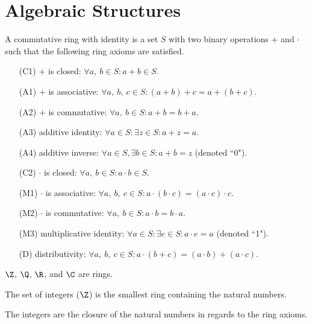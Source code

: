 \documentclass{article}
\begin{document}
\section{Algebraic Structures}
\begin{tcolorboxlarge}[title={Ring Axioms}]
    \begin{definition}
        A commutative ring with identity is a set $S$ with two binary operations $+$ and $\cdot$ such that the following ring axioms are satisfied.
    \end{definition}
    \begin{enumerate}[leftmargin=3.5em, itemsep=0.2em, topsep=0.35em]
        \item[(C1)] $+$ is closed: $\forall a,\:b \in S: a+b \in S$.
        \item[(A1)] $+$ is associative: $\forall a,\:b,\:c \in S: (a+b)+c = a+(b+c)$.
        \item[(A2)] $+$ is commutative: $\forall a,\:b \in S: a+b=b+a$.
        \item[(A3)] additive identity: $\forall a\in S:\exists z \in S:a+z=a$.
        \item[(A4)] additive inverse: $\forall a \in S, \exists b\in S: a+b = z$ (denoted ``0").
        \item[(C2)] $\cdot$ is closed: $\forall a,\:b \in S: a \cdot b \in S$.
        \item[(M1)] $\cdot$ is associative: $\forall a,\:b,\:c \in S:a \cdot (b \cdot c) = (a \cdot c) \cdot c$.
        \item[(M2)] $\cdot$ is commutative: $\forall a,\:b \in S:a \cdot b = b \cdot a$.
        \item[(M3)] multiplicative identity: $\forall a \in S:\exists e \in S:a \cdot e = a$ (denoted ``1").
        \item[(D)] distributivity: $\forall a,\:b,\:c \in S: a \cdot (b + c) = (a \cdot b) + (a \cdot c)$.
    \end{enumerate}
\end{tcolorboxlarge}
\begin{note}
    $\Z$, $\Q$, $\R$, and $\C$ are rings.
\end{note}
%
\begin{definition}[Integers]
    The set of integers ($\Z$) is the smallest ring containing the natural numbers.
\end{definition}
\begin{note}
    The integers are the closure of the natural numbers in regards to the ring axioms.
\end{note}
\end{document}
